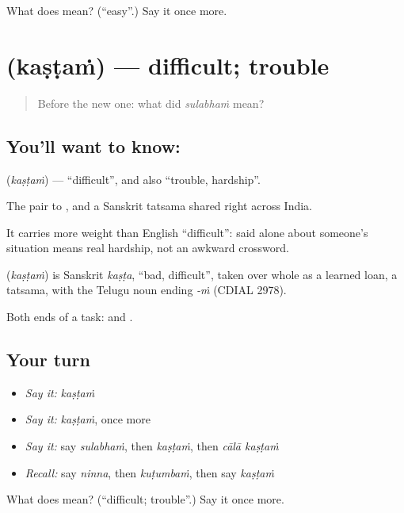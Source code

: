 \begin{tcolorbox}[breakable,colback=teal!4,colframe=teal!35!black,title={Before you move on}]
What does  mean? (\textquotedblleft{}easy\textquotedblright{}.) Say it once more.
\end{tcolorbox}
\section[\texorpdfstring{\te{కష్టం} (kaṣṭaṁ)}{కష్టం (kaṣṭaṁ)}]{ (kaṣṭaṁ) — difficult; trouble}

\label{lesson:TE-C76-difficult}



\begin{quote}
Before the new one: what did \emph{sulabhaṁ} mean?
\end{quote}

\subsection*{You'll want to know: }
\textbf{} (\emph{kaṣṭaṁ}) — \textquotedblleft{}difficult\textquotedblright{}, and also \textquotedblleft{}trouble, hardship\textquotedblright{}.

The pair to , and a Sanskrit tatsama shared right across India.

It carries more weight than English \textquotedblleft{}difficult\textquotedblright{}: \textbf{} said alone about someone's situation means real hardship, not an awkward crossword.

\begin{cousinweb}
\textbf{} (\emph{kaṣṭaṁ}) is Sanskrit \emph{kaṣṭa}, \textquotedblleft{}bad, difficult\textquotedblright{}, taken over whole as a learned loan, a tatsama, with the Telugu noun ending \emph{-ṁ} (CDIAL 2978).
\end{cousinweb}

\begin{grammarlens}[title={What you've built}]
Both ends of a task:  and .
\end{grammarlens}

\subsection*{Your turn}
\begin{itemize}
\raggedright
  \item \emph{Say it:} \emph{kaṣṭaṁ}
  \item \emph{Say it:} \emph{kaṣṭaṁ}, once more
  \item \emph{Say it:} say \emph{sulabhaṁ}, then \emph{kaṣṭaṁ}, then \emph{cālā kaṣṭaṁ}
  \item \emph{Recall:} say \emph{ninna}, then \emph{kuṭumbaṁ}, then say \emph{kaṣṭaṁ}
\end{itemize}

\begin{tcolorbox}[breakable,colback=teal!4,colframe=teal!35!black,title={Before you move on}]
What does  mean? (\textquotedblleft{}difficult; trouble\textquotedblright{}.) Say it once more.
\end{tcolorbox}
